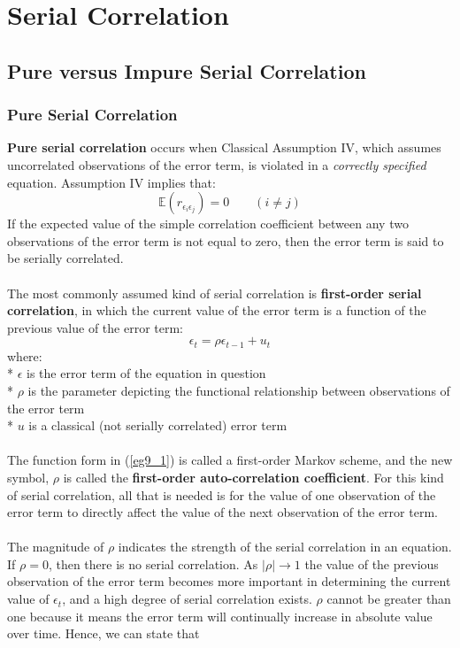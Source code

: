 \documentclass[11pt]{article}
\begin{document}
\section{Serial Correlation}
\subsection{Pure versus Impure Serial Correlation}
\subsubsection{Pure Serial Correlation}
\textbf{Pure serial correlation} occurs when Classical Assumption IV, which assumes uncorrelated observations of the error term, is violated in a \textit{correctly specified} equation. Assumption IV implies that:
$$
\mathbb{E}(r_{\epsilon_i \epsilon_j}) = 0 \quad\quad(i \neq j)
$$
If the expected value of the simple correlation coefficient between any two observations of the error term is not equal to zero, then the error term is said to be serially correlated. \\ \\
The most commonly assumed kind of serial correlation is \textbf{first-order serial correlation}, in which the current value of the error term is a function of the previous value of the error term:
\begin{equation}
\epsilon_t = \rho\epsilon_{t-1} + u_t \label{eg9_1}
\end{equation} 
where:\\*
$\epsilon$ is the error term of the equation in question\\*
$\rho$ is the parameter depicting the functional relationship between observations of the error term\\*
$u$ is a classical (not serially correlated) error term\\ \\
The function form in (\ref{eg9_1}) is called a first-order Markov scheme, and the new symbol, $\rho$ is called the \textbf{first-order auto-correlation coefficient}. For this kind of serial correlation, all that is needed is for the value of one observation of the error term to directly affect the value of the next observation of the error term.\\ \\
The magnitude of $\rho$ indicates the strength of the serial correlation in an equation. If $\rho = 0$, then there is no serial correlation. As $|\rho| \rightarrow 1$ the value of the previous observation of the error term becomes more important in determining the current value of $\epsilon_t$, and a high degree of serial correlation exists. $\rho$ cannot be greater than one because it means the error term will continually increase in absolute value over time. Hence, we can state that
\end{document}
